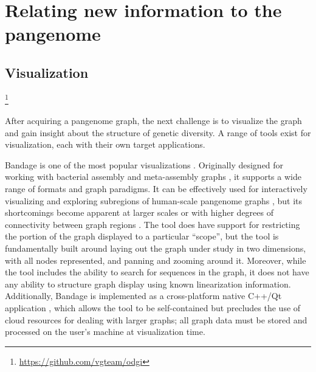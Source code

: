 \section{Relating new information to the pangenome}

\subsection{Visualization}

\cite{nielsen2009abyss}
\cite{yokoyama_momi-g:_2019}
\cite{nazarie_visualization_nodate_2019}
\footnote{\url{https://github.com/vgteam/odgi}}


After acquiring a pangenome graph, the next challenge is to visualize the graph and gain insight about the structure of genetic diversity.
A range of tools exist for visualization, each with their own target applications.

Bandage \citep{Wick_2015} is one of the most popular visualizations \citep{Mikheenko_2019}.
Originally designed for working with bacterial assembly and meta-assembly graphs \citep{Wick_2015}, it supports a wide range of formats and graph  paradigms.
It can be effectively used for interactively visualizing and exploring subregions of human-scale pangenome graphs \citep{Garrison_2019}, but its shortcomings become apparent at larger scales or with higher degrees of connectivity between graph regions \citep{Mikheenko_2019}.
The tool does have support for restricting the portion of the graph displayed to a particular ``scope'', but the tool is fundamentally built around laying out the graph under study in two dimensions, with all nodes represented, and panning and zooming around it.
Moreover, while the tool includes the ability to search for sequences in the graph, it does not have any ability to structure graph display using known linearization information.
Additionally, Bandage is implemented as a cross-platform native C++/Qt application \citep{Wick_2015}, which allows the tool to be self-contained but precludes the use of cloud resources for dealing with larger graphs; all graph data must be stored and processed on the user's machine at visualization time.

